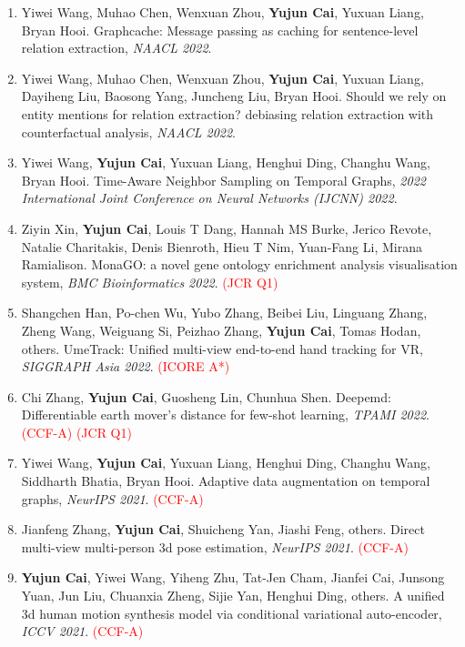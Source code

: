 \documentclass[11pt,letterpaper]{article}
\begin{document}
\begin{enumerate}
\item Yiwei Wang, Muhao Chen, Wenxuan Zhou, \textbf{Yujun Cai}, Yuxuan Liang, Bryan Hooi. Graphcache: Message passing as caching for sentence-level relation extraction, \textit{NAACL 2022}.

\item Yiwei Wang, Muhao Chen, Wenxuan Zhou, \textbf{Yujun Cai}, Yuxuan Liang, Dayiheng Liu, Baosong Yang, Juncheng Liu, Bryan Hooi. Should we rely on entity mentions for relation extraction? debiasing relation extraction with counterfactual analysis, \textit{NAACL 2022}.

\item Yiwei Wang, \textbf{Yujun Cai}, Yuxuan Liang, Henghui Ding, Changhu Wang, Bryan Hooi. Time-Aware Neighbor Sampling on Temporal Graphs, \textit{2022 International Joint Conference on Neural Networks (IJCNN) 2022}.

\item Ziyin Xin, \textbf{Yujun Cai}, Louis T Dang, Hannah MS Burke, Jerico Revote, Natalie Charitakis, Denis Bienroth, Hieu T Nim, Yuan-Fang Li, Mirana Ramialison. MonaGO: a novel gene ontology enrichment analysis visualisation system, \textit{BMC Bioinformatics 2022}. \textcolor{red}{(JCR Q1)}

\item Shangchen Han, Po-chen Wu, Yubo Zhang, Beibei Liu, Linguang Zhang, Zheng Wang, Weiguang Si, Peizhao Zhang, \textbf{Yujun Cai}, Tomas Hodan, others. UmeTrack: Unified multi-view end-to-end hand tracking for VR, \textit{SIGGRAPH Asia 2022}. \textcolor{red}{(ICORE A*)}

\item Chi Zhang, \textbf{Yujun Cai}, Guosheng Lin, Chunhua Shen. Deepemd: Differentiable earth mover's distance for few-shot learning, \textit{TPAMI 2022}. \textcolor{red}{(CCF-A)} \textcolor{red}{(JCR Q1)}

\item Yiwei Wang, \textbf{Yujun Cai}, Yuxuan Liang, Henghui Ding, Changhu Wang, Siddharth Bhatia, Bryan Hooi. Adaptive data augmentation on temporal graphs, \textit{NeurIPS 2021}. \textcolor{red}{(CCF-A)}

\item Jianfeng Zhang, \textbf{Yujun Cai}, Shuicheng Yan, Jiashi Feng, others. Direct multi-view multi-person 3d pose estimation, \textit{NeurIPS 2021}. \textcolor{red}{(CCF-A)}

\item \textbf{Yujun Cai}, Yiwei Wang, Yiheng Zhu, Tat-Jen Cham, Jianfei Cai, Junsong Yuan, Jun Liu, Chuanxia Zheng, Sijie Yan, Henghui Ding, others. A unified 3d human motion synthesis model via conditional variational auto-encoder, \textit{ICCV 2021}. \textcolor{red}{(CCF-A)}


\end{enumerate}
\end{document}
